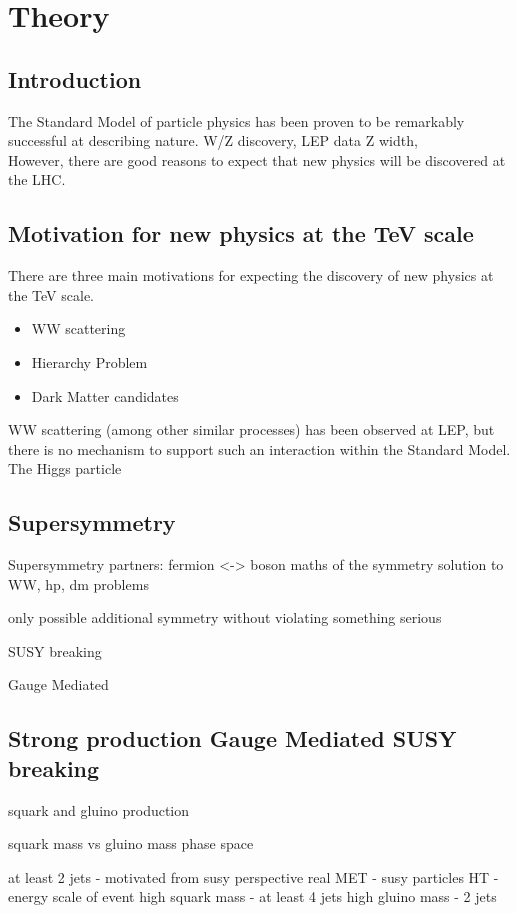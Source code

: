 \chapter{Theory}

\section{Introduction}

The Standard Model of particle physics has been proven to be remarkably 
successful at describing nature. W/Z discovery, LEP data Z width, \\

However, there are good reasons to expect that new physics will be discovered at
the LHC. 

\section{Motivation for new physics at the TeV scale}

There are three main motivations for expecting the discovery of new physics at 
the TeV scale.

\begin{itemize}
\item WW scattering
\item Hierarchy Problem
\item Dark Matter candidates
\end{itemize}

WW scattering (among other similar processes) has been observed at LEP, but
there is no mechanism to support such an interaction within the Standard Model.
The Higgs particle 

\section{Supersymmetry}

Supersymmetry partners: fermion <-> boson
maths of the symmetry
solution to WW, hp, dm problems

only possible additional symmetry without violating something serious

SUSY breaking

Gauge Mediated

\section{Strong production Gauge Mediated SUSY breaking}

squark and gluino production

squark mass vs gluino mass phase space 

at least 2 jets - motivated from susy perspective
real MET - susy particles
HT - energy scale of event
high squark mass - at least 4 jets
high gluino mass - 2 jets
